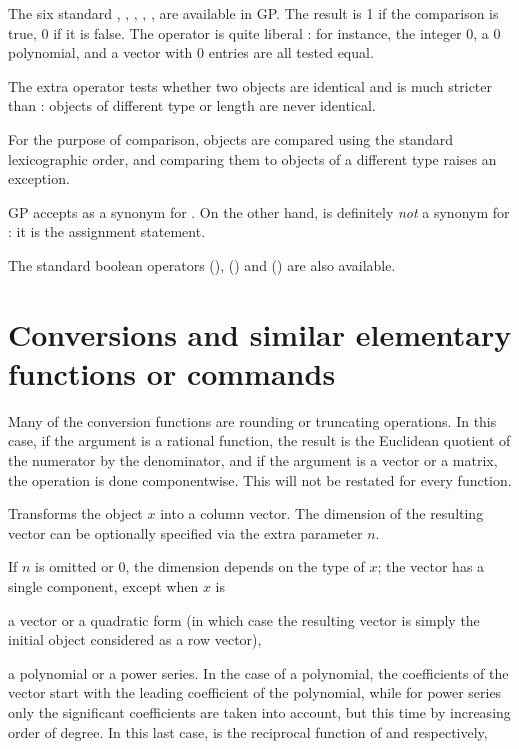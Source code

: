  The six
standard  \kbd{<=}, \kbd{<}, \kbd{>=}, \kbd{>},
\kbd{==}, \kbd{!=} are available in GP. The result is 1 if the comparison is
true, 0 if it is false. The operator \kbd{==} is quite liberal : for
instance, the integer 0, a 0 polynomial, and a vector with 0 entries are all
tested equal.

The extra operator \kbd{===} tests whether two objects are identical and is
much stricter than \kbd{==} : objects of different type or length are never
identical.

For the purpose of comparison,  objects are compared using
the standard lexicographic order, and comparing them to objects
of a different type raises an exception.

GP accepts \kbd{<>} as a synonym for \kbd{!=}. On the other hand, \kbd{=} is
definitely \emph{not} a synonym for \kbd{==}: it is the assignment statement.

The standard boolean operators \kbd{||} (), \kbd{\&\&}
() and \kbd{!} () are also available.

\section{Conversions and similar elementary functions or commands}
\label{se:conversion}

\noindent
Many of the conversion functions are rounding or truncating operations. In
this case, if the argument is a rational function, the result is the
Euclidean quotient of the numerator by the denominator, and if the argument
is a vector or a matrix, the operation is done componentwise. This will not
be restated for every function.


\label{se:Col}
Transforms the object $x$ into a column vector. The dimension of the
resulting vector can be optionally specified via the extra parameter $n$.

If $n$ is omitted or $0$, the dimension depends on the type of $x$; the
vector has a single component, except when $x$ is

\item a vector or a quadratic form (in which case the resulting vector
is simply the initial object considered as a row vector),

\item a polynomial or a power series. In the case of a polynomial, the
coefficients of the vector start with the leading coefficient of the
polynomial, while for power series only the significant coefficients are
taken into account, but this time by increasing order of degree.
In this last case,  is the reciprocal function of  and
 respectively,

